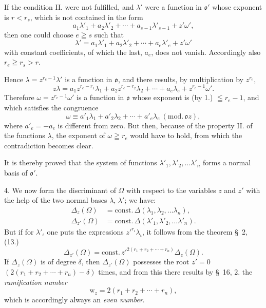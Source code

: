 \documentclass{article}
\begin{document}
If the condition II. were not fulfilled, and $\lambda'$ were a function in $\mathfrak{o}'$ whose exponent is $r < r_{s}$, which is not contained in the form
\[ a_{1}\lambda'_{1} + a_{2}\lambda'_{2} + \cdots + a_{s-1}\lambda'_{s-1} + z'\omega', \]
then one could choose $e \geqq s$ such that
\[ \lambda' = a_{1}\lambda'_{1} + a_{2}\lambda'_{2} + \cdots + a_{e}\lambda'_{e} + z'\omega' \]
with constant coefficients, of which the last, $a_{e}$, does not vanish. Accordingly also $r_{e} \geqq r_{s} > r$.

Hence $\lambda = z^{r_{e}-1}\lambda'$ is a function in $\mathfrak{o}$, and there results, by multiplication by $z^{r_{e}}$,
\[ z\lambda = a_{1}z^{r_{e}-r_{1}}\lambda_{1} + a_{2}z^{r_{e}-r_{2}}\lambda_{2} + \cdots + a_{e}\lambda_{e} + z^{r_{e}-1}\omega'. \]
Therefore $\omega = z^{r_{e}-1}\omega'$ is a function in $\mathfrak{o}$ whose exponent is (by 1.) $\leqq r_{e}-1$, and which satisfies the congruence
\[ \omega \equiv a'_{1}\lambda_{1} + a'_{2}\lambda_{2} + \cdots + a'_{e}\lambda_{e}\ (\text{mod.}\,\mathfrak{o}z), \]
where $a'_{e} = -a_{e}$ is different from zero. But then, because of the property II. of the functions $\lambda$, the exponent of $\omega \geqq r_{e}$ would have to hold, from which the contradiction becomes clear.

It is thereby proved that the system of functions $\lambda'_{1}, \lambda'_{2}, \ldots \lambda'_{n}$ forms a normal basis of $\mathfrak{o}'$.


4. We now form the discriminant of $\Omega$ with respect to the variables $z$ and $z'$ with the help of the two normal bases $\lambda$, $\lambda'$; we have:
\[ \begin{aligned} \Delta_{z}(\Omega) &= \text{const.}\,\Delta(\lambda_{1}, \lambda_{2}, \ldots \lambda_{n}), \\ \Delta_{z'}(\Omega) &= \text{const.}\,\Delta(\lambda'_{1}, \lambda'_{2}, \ldots \lambda'_{n}). \end{aligned} \]
But if for $\lambda'_{\iota}$ one puts the expressions $z'^{r_{\iota}}\lambda_{\iota}$, it follows from the theorem §~2, (13.)
\[ \Delta_{z'}(\Omega) = \text{const.}\,z'^{2(r_{1}+r_{2}+\cdots+r_{n})}\Delta_{z}(\Omega). \]
If $\Delta_{z}(\Omega)$ is of degree $\delta$, then $\Delta_{z'}(\Omega)$ possesses the root $z' = 0$ $(2(r_{1}+r_{2}+\cdots+r_{n})-\delta)$ times, and from this there results by §~16, 2. the \emph{ramification number}
\[ \mathrm{w}_{z} = 2(r_{1}+r_{2}+\cdots+r_{n}), \]
which is accordingly always an \emph{even number}.
\end{document}
